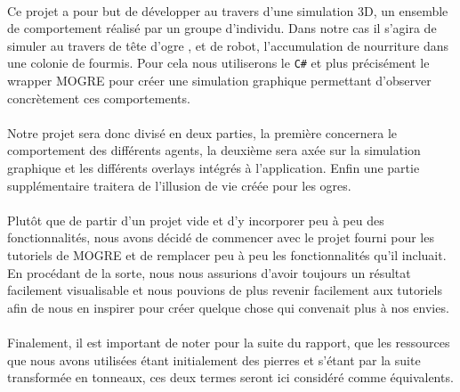 \paragraph{}
Ce projet a pour but de développer au travers d'une simulation 3D, un
ensemble de comportement réalisé par un groupe d'individu. Dans notre cas il
s'agira de simuler au travers de tête d'ogre , et de robot, l'accumulation de
nourriture dans une colonie de fourmis. Pour cela nous utiliserons le
\verb!C#! et plus précisément le wrapper MOGRE pour créer une simulation
graphique permettant d'observer concrètement ces comportements.

\paragraph{}

Notre projet sera donc divisé en deux parties, la première concernera 
le comportement des différents agents, la deuxième sera axée sur la simulation
graphique et les différents overlays intégrés à l'application. Enfin une partie
supplémentaire traitera de l'illusion de vie créée pour les ogres.

\paragraph{}
Plutôt que de partir d'un projet vide et d'y incorporer peu à peu des
fonctionnalités, nous avons décidé de commencer avec le projet fourni pour
les tutoriels de MOGRE et de remplacer peu à peu les fonctionnalités qu'il
incluait. En procédant de la sorte, nous nous assurions d'avoir toujours un
résultat facilement visualisable et nous pouvions de plus revenir facilement aux
tutoriels afin de nous en inspirer pour créer quelque chose qui convenait plus à
nos envies.

\paragraph{}
Finalement, il est important de noter pour la suite du rapport, que les
ressources que nous avons utilisées étant initialement des pierres et s'étant
par la suite transformée en tonneaux, ces deux termes seront ici considéré comme
équivalents.
